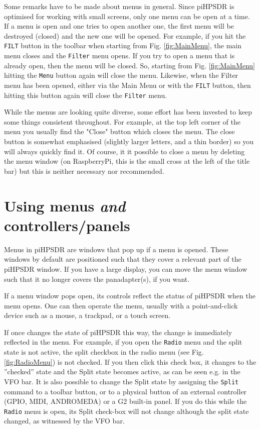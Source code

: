 \documentclass[12pt]{book}
\def\rett#1{\texttt{\color{red}#1}}
\def\bltt#1{\texttt{\color{blue}#1}}
\def\pH{pi\-HPSDR\xspace}
\begin{document}
Some remarks have to be made about menus in general. Since \pH is optimised for
working with small screens, only one menu can be open at a time. If a menu is open
and one tries to open another one, the first menu will be destroyed (closed) and the
new one will be opened. For example, if you hit the \rett{FILT} button in the toolbar
when starting from Fig. \ref{fig:MainMenu}, the main menu closes and the \bltt{Filter} menu
opens. If you try to open a menu that is already open, then the menu will be closed.
So, starting from Fig. \ref{fig:MainMenu} hitting the \rett{Menu} button again will close
the menu. Likewise, when the Filter menu has been opened, either via the Main Menu
or with the \rett{FILT} button, then hitting this button again will close the
\bltt{Filter} menu.

While the menus are looking quite diverse, some effort has been invested to keep
some things consistent throughout. For example, at the top left corner of the menu
you usually find the "Close" button which closes the menu. The close button is somewhat
emphasised (slightly larger letters, and a thin border) so you will always quickly find it.
Of course, it it possible to close a menu by deleting the menu window (on RaspberryPi,
this is the small cross at the left of the title bar) but this is neither necessary nor
recommended.

\section{Using menus \textit{and} controllers/panels}

Menus in \pH are windows that pop up if a menu is opened. These windows by default are positioned such
that they cover a relevant part of the \pH window. If you have a large display, you can move the menu
window such that it no longer covers the panadapter(s), if you want.

If a menu window pops open, its controls reflect the status of \pH when the menu opens. One can then operate
the menu, usually with a point-and-click device such as a mouse, a trackpad, or a touch screen.

If once changes the state of \pH this way, the change is immediately reflected in the menu. For example,
if you open the \bltt{Radio} menu and the split state is not active, the split checkbox in the radio
menu (see Fig. \ref{fig:RadioMenu}) is not checked. If you then click this check box, it changes to
the ''checked'' state and the Split state becomes active, as can be seen e.g. in the VFO bar. It is also
possible to change the Split state by assigning the \texttt{Split} command to a toolbar button, or to
a physical button of an external controller (GPIO, MIDI, ANDROMEDA) or a G2 built-in panel. If you do this
while the \bltt{Radio} menu is open, its Split check-box will not change although the split state changed,
as witnessed by the VFO bar.
\end{document}
